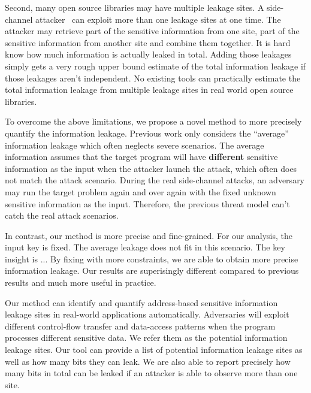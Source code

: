 Second, many open source libraries may have multiple leakage sites. 
A side-channel attacker~\cite{191010,7163052,hornby2011side} can exploit more than one leakage 
sites at one time. 
The attacker may retrieve part of the sensitive information from one site, part of the sensitive
information from another site and combine them together.
It is hard know how much information is actually leaked in total. Adding those leakages 
simply gets a very rough upper bound estimate of the total information leakage if those 
leakages aren’t independent. No existing tools can practically estimate the total information 
leakage from multiple leakage sites in real world open source libraries.

To overcome the above limitations, we propose a novel method
to more precisely quantify the information leakage. Previous work only considers the
``average'' information leakage which often neglects severe scenarios.
The average information assumes that the target program will have \textbf{different} sensitive 
information as the input when the attacker launch the attack,
which often does not match the attack scenario. During the real side-channel
attacks, an adversary may run the target problem again and over again with the 
fixed unknown sensitive information as the input. Therefore, the previous
threat model can't catch the real attack scenarios.

In contrast, our method is more precise and fine-grained. 
For our analysis, the input key is fixed.
The average leakage does not fit in this scenario.
The key insight is ...  
By fixing with more constraints, we are able to obtain more precise information leakage.
Our results are superisingly different compared to previous results
and much more useful in practice.
 

Our method can identify and quantify address-based
sensitive information leakage sites in real-world applications automatically. 
Adversaries will exploit different control-flow transfer and data-access patterns when 
the program processes different sensitive data. We refer them as the potential information
leakage sites. Our tool can provide a list of potential information leakage sites as well as how many 
bits they can leak. We are also able to report precisely how many bits in total
can be leaked if an attacker is able to observe more than one site.

